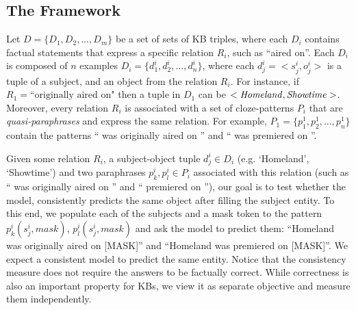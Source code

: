 \subsection{The Framework}
\label{sec:framework}
Let
$D = \{D_1, D_2,
\dots, D_m\}$
be a set of sets of KB triples,
where each $D_i$ contains factual statements
that express a specific relation $R_i$, such as ``aired
on''. Each $D_i$ is composed of $n$ examples $D_i = \{d_1^i,
d_2^i, \dots, d_n^i\}$, where each $d_j^i = <s_j^i,o_j^i>$ is a tuple of a subject, and an object from the relation $R_i$. 
For instance, if $R_1=\text{``originally
  aired on"}$ then a tuple in $D_1$ can be $<\text{\textit{Homeland}}, \text{\textit{Showtime}}>$. Moreover, every relation $R_i$ is associated with a set of cloze-patterns $P_i$ that are \textit{quasi-paraphrases} and express the same relation. For example, $P_1=\{p_1^1, p_2^1, \dots, p_n^1\}$ contain the patterns ``\subj{} was originally aired on \obj{}'' and ``\subj{} was premiered on \obj{}''.

Given some relation $R_i$, a subject-object tuple $d_j^i \in D_i$ (e.g. `Homeland', `Showtime') and two paraphrases $p_k^i, p_l^i \in P_i$ associated with this relation (such as ``\subj{} was originally aired on \obj{}'' and ``\subj{} premiered on \obj{}''), our goal is to test whether the model, consistently predicts the same object after filling the subject entity. To this end, we populate each of the subjects and a mask token to the pattern $p_k^i(s_j^i,mask)$, $p_l^i(s_j^i,mask)$
and ask the model to predict them: ``Homeland was originally aired on [MASK]'' and ``Homeland was premiered on [MASK]''.  We expect a consistent model to predict the same entity. Notice that the consistency measure does not require the answers to be factually correct. While correctness is also an important property for KBs, we view it as separate objective and measure them independently. 


